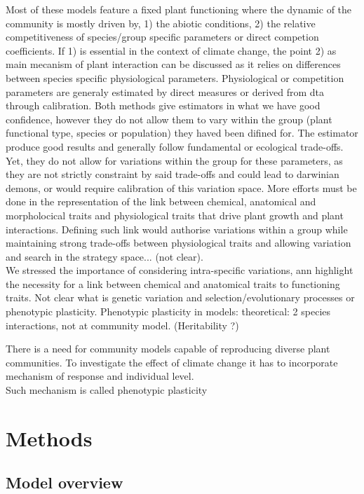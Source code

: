 \documentclass[review]{elsarticle}
\begin{document}
Most of these models feature a fixed plant functioning where the dynamic of the community is mostly driven by, 1) the abiotic conditions, 2) the relative competitiveness of species/group specific parameters or direct competion coefficients. If 1) is essential in the context of climate change, the point 2) as main mecanism of plant interaction can be discussed as it relies on differences between species specific physiological parameters. Physiological or competition parameters are generaly estimated by direct measures or derived from dta through calibration. Both methods give estimators in what we have good confidence, however they do not allow them to vary within the group (plant functional type, species or population) they haved been difined for. The estimator produce good results and generally follow fundamental or ecological trade-offs. Yet, they do not allow for variations within the group for these parameters, as they are not strictly constraint by said trade-offs and could lead to darwinian demons, or would require calibration of this variation space. More efforts must be done in the representation of the link  between chemical, anatomical and morpholocical traits and physiological traits that drive plant growth and plant interactions. Defining such link would authorise variations within a group while maintaining strong trade-offs between physiological traits and allowing variation and search in the strategy space... (not clear).\\

We stressed the importance of considering intra-specific variations, ann highlight the necessity for a link between chemical and anatomical traits to functioning traits.  
 Not clear what is genetic variation and selection/evolutionary processes or phenotypic plasticity. Phenotypic plasticity in models: theoretical: 2 species interactions, not at community model. (Heritability ?)




There is a need for community models capable of reproducing diverse plant communities. To investigate the effect of climate change it has to incorporate mechanism of response and individual level.\\
Such mechanism is called phenotypic plasticity\\

\section{Methods}
\subsection{Model overview}
\end{document}
